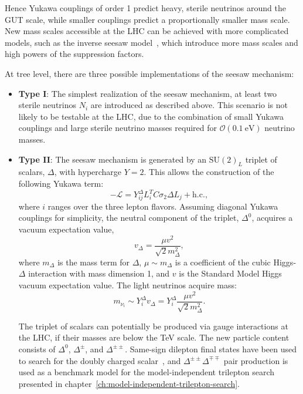 Hence Yukawa couplings of order 1 predict heavy, sterile neutrinos around the GUT scale, while smaller couplings predict a proportionally smaller mass scale. New mass scales accessible at the LHC can be achieved with more complicated models, such as the inverse seesaw model~\cite{Deppisch:2005ky}, which introduce more mass scales and high powers of the suppression factors.

At tree level, there are three possible implementations of the seesaw mechanism: 
\begin{itemize}
	\item \textbf{Type I}: The simplest realization of the seesaw mechanism, at least two sterile neutrinos $N_i$ are introduced as described above. This scenario is not likely to be testable at the LHC, due to the combination of small Yukawa couplings and large sterile neutrino masses required for $\mathcal{O}(0.1~\mbox{eV})$ neutrino masses. 

	\item \textbf{Type II}: The seesaw mechanism is generated by an $\mathrm{SU}(2)_L$ triplet of scalars, $\Delta$, with hypercharge $Y=2$. This allows the construction of the following Yukawa term:
	\begin{equation}
		-\mathcal{L} = Y^{\Delta}_{ij} L_{i}^T C \sigma_2 \Delta L_{j} + \mathrm{h.c.},
	\end{equation}
	where $i$ ranges over the three lepton flavors.  Assuming diagonal Yukawa couplings for simplicity, the neutral component of the triplet, $\Delta^0$, acquires a vacuum expectation value,
	\begin{equation}
		v_{\Delta} = \frac{\mu v^2}{\sqrt{2} m_{\Delta}^2},
	\end{equation}
	where $m_{\Delta}$ is the mass term for $\Delta$, $\mu\sim m_{\Delta}$ is a coefficient of the cubic Higgs-$\Delta$ interaction with mass dimension 1, and $v$ is the Standard Model Higgs vacuum expectation value. The light neutrinos acquire mass:
	\begin{equation}
		m_{\nu_{i}} \sim Y^{\Delta}_{i} v_{\Delta}=Y^{\Delta}_{i} \frac{\mu v^2}{\sqrt{2} m_{\Delta}^2}.
	\end{equation}

	The triplet of scalars can potentially be produced via gauge interactions at the LHC, if their masses are below the TeV scale. The new particle content consists of $\Delta^0$, $\Delta^{\pm}$, and $\Delta^{\pm\pm}$. Same-sign dilepton final states have been used to search for the doubly charged scalar~\cite{TheATLASCollaboration:2015gu}, and $\Delta^{\pm\pm}\Delta^{\mp\mp}$ pair production is used as a benchmark model for the model-independent trilepton search presented in chapter~\ref{ch:model-independent-trilepton-search}. 



\end{itemize}
